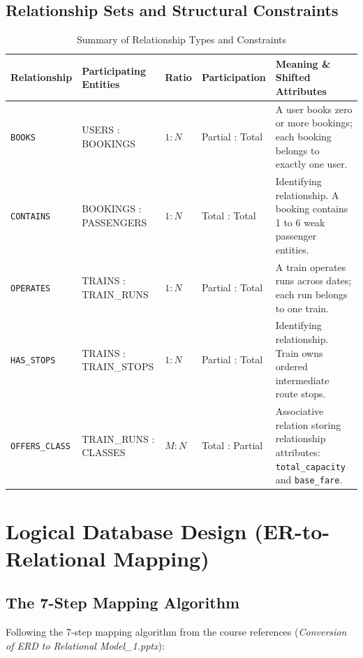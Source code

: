 \documentclass[12pt,a4paper]{report}
\begin{document}
\section{Relationship Sets and Structural Constraints}
\begin{table}[H]
    \centering
    \small
    \begin{tabular}{@{}llllp{5.5cm}@{}}
        \toprule
        \textbf{Relationship} & \textbf{Participating Entities} & \textbf{Ratio} & \textbf{Participation} & \textbf{Meaning \& Shifted Attributes} \\
        \midrule
        \texttt{BOOKS} & USERS : BOOKINGS & $1:N$ & Partial : Total & A user books zero or more bookings; each booking belongs to exactly one user. \\
        \texttt{CONTAINS} & BOOKINGS : PASSENGERS & $1:N$ & Total : Total & Identifying relationship. A booking contains 1 to 6 weak passenger entities. \\
        \texttt{OPERATES} & TRAINS : TRAIN\_RUNS & $1:N$ & Partial : Total & A train operates runs across dates; each run belongs to one train. \\
        \texttt{HAS\_STOPS} & TRAINS : TRAIN\_STOPS & $1:N$ & Partial : Total & Identifying relationship. Train owns ordered intermediate route stops. \\
        \texttt{OFFERS\_CLASS} & TRAIN\_RUNS : CLASSES & $M:N$ & Total : Partial & Associative relation storing relationship attributes: \texttt{total\_capacity} and \texttt{base\_fare}. \\
        \bottomrule
    \end{tabular}
    \caption{Summary of Relationship Types and Constraints}
    \label{tab:relationships}
\end{table}

\chapter{Logical Database Design (ER-to-Relational Mapping)}

\section{The 7-Step Mapping Algorithm}
Following the 7-step mapping algorithm from the course references (\textit{Conversion of ERD to Relational Model\_1.pptx}):
\end{document}
